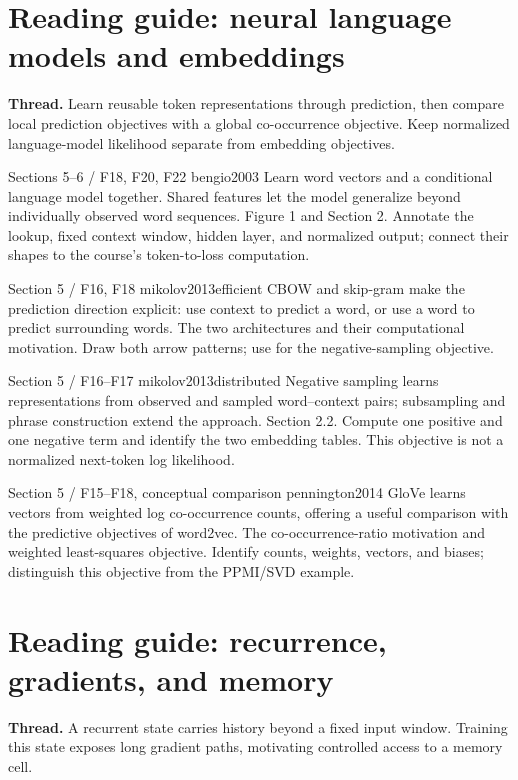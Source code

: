 \clearpage
\section{Reading guide: neural language models and embeddings}
\textbf{Thread.} Learn reusable token representations through prediction,
then compare local prediction objectives with a global co-occurrence objective.
Keep normalized language-model likelihood separate from embedding objectives.

  {Sections 5--6 \quad / \quad F18, F20, F22}
  {bengio2003}
  {Learn word vectors and a conditional language model together. Shared
  features let the model generalize beyond individually observed word sequences.}
  {Figure 1 and Section 2. Annotate the lookup, fixed context window,
  hidden layer, and normalized output; connect their shapes to the course's
  token-to-loss computation.}

  {Section 5 \quad / \quad F16, F18}
  {mikolov2013efficient}
  {CBOW and skip-gram make the prediction direction explicit: use context
  to predict a word, or use a word to predict surrounding words.}
  {The two architectures and their computational motivation. Draw both
  arrow patterns; use  for the negative-sampling objective.}

  {Section 5 \quad / \quad F16--F17}
  {mikolov2013distributed}
  {Negative sampling learns representations from observed and sampled
  word--context pairs; subsampling and phrase construction extend the approach.}
  {Section 2.2. Compute one positive and one negative term and identify
  the two embedding tables. This objective is not a normalized next-token
  log likelihood.}

  {Section 5 \quad / \quad F15--F18, conceptual comparison}
  {pennington2014}
  {GloVe learns vectors from weighted log co-occurrence counts, offering a
  useful comparison with the predictive objectives of word2vec.}
  {The co-occurrence-ratio motivation and weighted least-squares objective.
  Identify counts, weights, vectors, and biases; distinguish this objective
  from the PPMI/SVD example.}

\clearpage
\section{Reading guide: recurrence, gradients, and memory}
\textbf{Thread.} A recurrent state carries history beyond a fixed input
window. Training this state exposes long gradient paths, motivating
controlled access to a memory cell.

